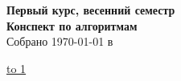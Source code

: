 \documentclass[12pt]{article}
\def\LINE{\vspace*{-1em}\noindent \underline{\hbox to 1\textwidth{{ } \hfil{ } \hfil{ } }}}
\theoremstyle{definition} %
\theoremstyle{plain} %
\theoremstyle{remark} %
\newlength{\sectionvskip}
\begin{document}
\pagestyle{empty}

\begin{center}
  {\Large \bf Первый курс, весенний семестр} \\
  \vspace{\sectionvskip} 
  {\Large \bf Конспект по алгоритмам} \\
  \vspace{\sectionvskip}
  {Собрано {\today} в {\currenttime}}
\end{center}

\LINE

\vspace{1em}
\tableofcontents
\pagebreak

\pagestyle{fancy}
\setcounter{page}{1}



\end{document}
